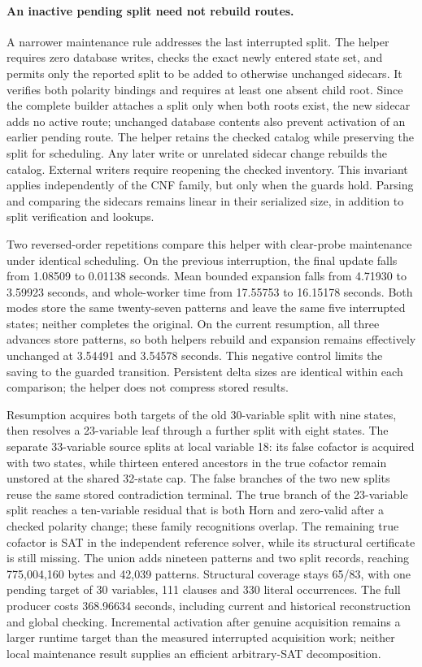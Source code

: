 \documentclass[11pt,a4paper]{article}
\numberwithin{equation}{section}
\theoremstyle{plain}
\theoremstyle{definition}
\theoremstyle{remark}
\begin{document}
\paragraph{An inactive pending split need not rebuild routes.}
A narrower maintenance rule addresses the last interrupted split. The helper requires zero database writes, checks the exact newly entered state set, and permits only the reported split to be added to otherwise unchanged sidecars. It verifies both polarity bindings and requires at least one absent child root. Since the complete builder attaches a split only when both roots exist, the new sidecar adds no active route; unchanged database contents also prevent activation of an earlier pending route. The helper retains the checked catalog while preserving the split for scheduling. Any later write or unrelated sidecar change rebuilds the catalog. External writers require reopening the checked inventory. This invariant applies independently of the CNF family, but only when the guards hold. Parsing and comparing the sidecars remains linear in their serialized size, in addition to split verification and lookups.

Two reversed-order repetitions compare this helper with clear-probe maintenance under identical scheduling. On the previous interruption, the final update falls from 1.08509 to 0.01138 seconds. Mean bounded expansion falls from 4.71930 to 3.59923 seconds, and whole-worker time from 17.55753 to 16.15178 seconds. Both modes store the same twenty-seven patterns and leave the same five interrupted states; neither completes the original. On the current resumption, all three advances store patterns, so both helpers rebuild and expansion remains effectively unchanged at 3.54491 and 3.54578 seconds. This negative control limits the saving to the guarded transition. Persistent delta sizes are identical within each comparison; the helper does not compress stored results.

Resumption acquires both targets of the old 30-variable split with nine states, then resolves a 23-variable leaf through a further split with eight states. The separate 33-variable source splits at local variable 18: its false cofactor is acquired with two states, while thirteen entered ancestors in the true cofactor remain unstored at the shared 32-state cap. The false branches of the two new splits reuse the same stored contradiction terminal. The true branch of the 23-variable split reaches a ten-variable residual that is both Horn and zero-valid after a checked polarity change; these family recognitions overlap. The remaining true cofactor is SAT in the independent reference solver, while its structural certificate is still missing. The union adds nineteen patterns and two split records, reaching 775,004,160 bytes and 42,039 patterns. Structural coverage stays 65/83, with one pending target of 30 variables, 111 clauses and 330 literal occurrences. The full producer costs 368.96634 seconds, including current and historical reconstruction and global checking. Incremental activation after genuine acquisition remains a larger runtime target than the measured interrupted acquisition work; neither local maintenance result supplies an efficient arbitrary-SAT decomposition.
\end{document}
